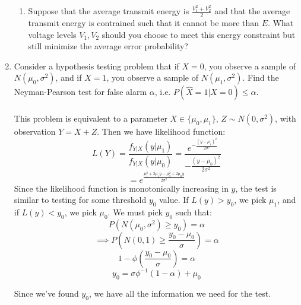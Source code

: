 \begin{enumerate}
\begin{enumerate}
      \item Suppose that the average transmit energy is $\frac{V_1^2 + V_2^2}{2}$ and that the average transmit energy is contrained such that it cannot be more than $E$. What voltage levels $V_1,V_2$ should you choose to meet this energy constraint but still minimize the average error probability?

    \end{enumerate}
  \item Consider a hypothesis testing problem that if $X = 0$, you observe a sample of $N(\mu_0, \sigma^2)$, and if $X = 1$, you observe a sample of $N(\mu_1, \sigma^2)$. Find the Neyman-Pearson test for false alarm $\alpha$, i.e. $P(\hat{X} = 1 | X = 0) \leq \alpha$.\\\\

    This problem is equivalent to a parameter $X \in \{\mu_0, \mu_1\}$, $Z \sim N(0, \sigma^2)$, with observation $Y = X+Z$. Then we have likelihood function:
    $$L(Y) = \frac{f_{Y|X}(y | \mu_1)}{f_{Y|X}(y | \mu_0)} = \frac{e^{-\frac{(y-\mu_1)^2}{2 \sigma^2}}}{-\frac{(y-\mu_0)^2}{2 \sigma^2}}$$
    $$=e^{\frac{\mu_1^2 + 2 \mu_1 y - \mu_0^2 + 2 \mu_0 y}{2 \sigma^2}}$$
    Since the likelihood function is monotonically increasing in $y$, the test is similar to testing for some threshold $y_0$ value. If $L(y) > y_0$, we pick $\mu_1$, and if $L(y) < y_0$, we pick $\mu_0$. We must pick $y_0$ such that:
    $$P(N(\mu_0, \sigma^2) \geq y_0) = \alpha$$
    $$\implies P(N(0,1) \geq \frac{y_0 - \mu_0}{\sigma}) = \alpha$$
    $$1 - \phi(\frac{y_0 - \mu_0}{\sigma}) = \alpha$$
    $$y_0 = \sigma \phi^{-1}(1 - \alpha) + \mu_0$$

    Since we've found $y_0$, we have all the information we need for the test.
\end{enumerate}


